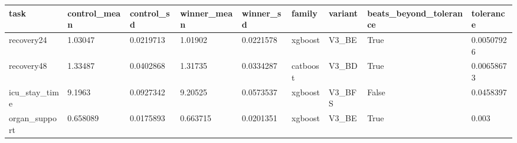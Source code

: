 \begin{tabular}{lllllllll}
\hline
task & control\_mean & control\_sd & winner\_mean & winner\_sd & family & variant & beats\_beyond\_tolerance & tolerance \\
\hline
recovery24 & 1.03047 & 0.0219713 & 1.01902 & 0.0221578 & xgboost & V3\_BE & True & 0.00507926 \\
recovery48 & 1.33487 & 0.0402868 & 1.31735 & 0.0334287 & catboost & V3\_BD & True & 0.00658673 \\
icu\_stay\_time & 9.1963 & 0.0927342 & 9.20525 & 0.0573537 & xgboost & V3\_BFS & False & 0.0458397 \\
organ\_support & 0.658089 & 0.0175893 & 0.663715 & 0.0201351 & xgboost & V3\_BE & True & 0.003 \\
\hline
\end{tabular}

